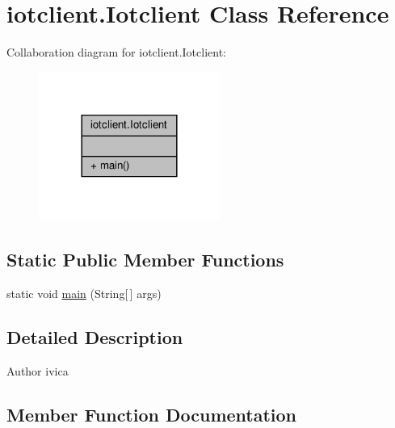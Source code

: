 \hypertarget{classiotclient_1_1Iotclient}{}\section{iotclient.\+Iotclient Class Reference}
\label{classiotclient_1_1Iotclient}


Collaboration diagram for iotclient.\+Iotclient\+:\nopagebreak
\begin{figure}[H]
\begin{center}
\leavevmode
\includegraphics[width=168pt]{classiotclient_1_1Iotclient__coll__graph}
\end{center}
\end{figure}
\subsection*{Static Public Member Functions}
\begin{DoxyCompactItemize}
\item 
static void \hyperlink{classiotclient_1_1Iotclient_a29aeb6bca70f911f937f294096c7b551}{main} (String\mbox{[}$\,$\mbox{]} args)
\end{DoxyCompactItemize}


\subsection{Detailed Description}
\begin{DoxyAuthor}{Author}
ivica 
\end{DoxyAuthor}


\subsection{Member Function Documentation}
\mbox{\label{classiotclient_1_1Iotclient_a29aeb6bca70f911f937f294096c7b551}} 
